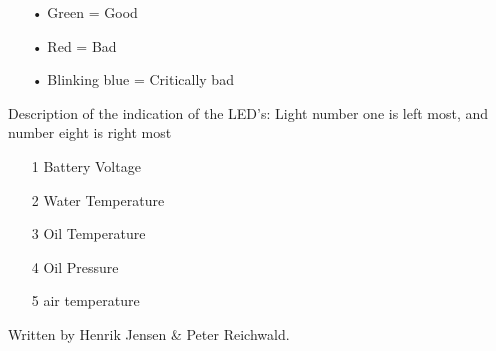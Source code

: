 \begin{enumerate}
	\item[•]Green = Good
	\item[•]Red = Bad
	\item[•]Blinking blue = Critically bad
\end{enumerate}
Description of the indication of the LED's:
Light number one is left most, and number eight is right most
\begin{enumerate}
	\item[1] Battery Voltage
	\item[2] Water Temperature
	\item[3] Oil Temperature
	\item[4] Oil Pressure
	\item[5] air temperature
\end{enumerate}
Written by Henrik Jensen \& Peter Reichwald.
